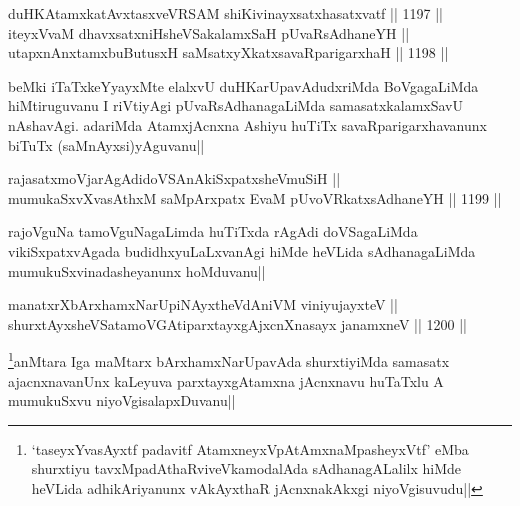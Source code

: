 
\begin{shl}
duHKAtamxkatAvxtasxveVRSAM shiKivinayxsatxhasatxvatf ||  1197 ||  \\
iteyxVvaM dhavxsatxniHsheVSakalamxSaH pUvaRsAdhaneYH || \\
utapxnAnxtamxbuButusxH saMsatxyXkatxsavaRparigarxhaH ||  1198 ||  
\end{shl}

\begin{artha}
beMki iTaTxkeYyayxMte elalxvU duHKarUpavAdudxriMda BoVgagaLiMda hiMtiruguvanu I riVtiyAgi pUvaRsAdhanagaLiMda samasatxkalamxSavU nAshavAgi. adariMda AtamxjAcnxna Ashiyu huTiTx savaRparigarxhavanunx biTuTx (saMnAyxsi)yAguvanu||
\end{artha}


\begin{shl}
rajasatxmoVjarAgAdidoVSAnAkiSxpatxsheVmuSiH || \\
mumukaSxvXvasAthxM saMpArxpatx EvaM pUvoVRkatxsAdhaneYH ||  1199 ||  
\end{shl}

\begin{artha}
rajoVguNa tamoVguNagaLimda huTiTxda rAgAdi doVSagaLiMda vikiSxpatxvAgada budidhxyuLaLxvanAgi hiMde heVLida sAdhanagaLiMda mumukuSxvinadasheyanunx hoMduvanu||
\end{artha}


\begin{shl}
manatxrXbArxhamxNarUpiNAyx\s theVdAniVM viniyujayxteV || \\
shurxtAyx\s sheVSatamoVGAtiparxtayxgAjxcnXnasayx janamxneV ||  1200 ||  
\end{shl}

\begin{artha}
\footnote{`taseyxYvasAyxtf padavitf AtamxneyxVpA\s\s tAmxnaMpasheyxVtf' eMba shurxtiyu tavxMpadAthaRviveVkamodalAda sAdhanagALalilx hiMde heVLida adhikAriyanunx vAkAyxthaR jAcnxnakAkxgi niyoVgisuvudu||}anMtara Iga maMtarx bArxhamxNarUpavAda shurxtiyiMda samasatx ajacnxnavanUnx kaLeyuva parxtayxgAtamxna jAcnxnavu huTaTxlu A mumukuSxvu niyoVgisalapxDuvanu||
\end{artha}


